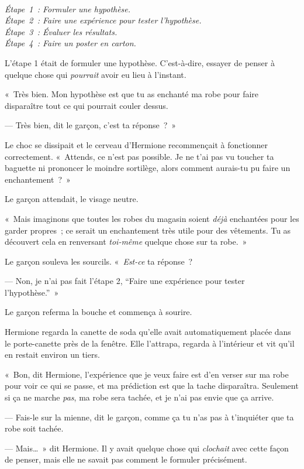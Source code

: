 \emph{\\
Étape~1~: Formuler une hypothèse.\\
Étape~2~: Faire une expérience pour tester l'hypothèse.\\
Étape~3~: Évaluer les résultats.\\
Étape~4~: Faire un poster en carton.\\
}

L'étape 1 était de formuler une hypothèse.
C'est-à-dire, essayer de penser à quelque chose qui \emph{pourrait} avoir eu lieu à l'instant.

«~Très bien. Mon hypothèse est que tu as enchanté ma robe pour faire disparaître tout ce qui pourrait couler dessus.

--- Très bien, dit le garçon, c'est ta réponse~?~»

Le choc se dissipait et le cerveau d'Hermione recommençait à fonctionner correctement.
«~Attends, ce n'est pas possible.
Je ne t'ai pas vu toucher ta baguette ni prononcer le moindre sortilège, alors comment aurais-tu pu faire un enchantement~?~»

Le garçon attendait, le visage neutre.

«~Mais imaginons que toutes les robes du magasin soient \emph{déjà} enchantées pour les garder propres~; ce serait un enchantement très utile pour des vêtements.
Tu as découvert cela en renversant \emph{toi-même} quelque chose sur ta robe.~»

Le garçon souleva les sourcils.
«~\emph{Est-ce} ta réponse~?

--- Non, je n'ai pas fait l'étape 2, “Faire une expérience pour tester l'hypothèse.”~»

Le garçon referma la bouche et commença à sourire.

Hermione regarda la canette de soda qu'elle avait automatiquement placée dans le porte-canette près de la fenêtre.
Elle l'attrapa, regarda à l'intérieur et vit qu'il en restait environ un tiers.

«~Bon, dit Hermione, l'expérience que je veux faire est d'en verser sur ma robe pour voir ce qui se passe, et ma prédiction est que la tache disparaîtra.
Seulement si ça ne marche \emph{pas}, ma robe sera tachée, et je n'ai pas envie que ça arrive.

--- Fais-le sur la mienne, dit le garçon, comme ça tu n'as pas à t'inquiéter que ta robe soit tachée.

--- Mais…~» dit Hermione. Il y avait quelque chose qui \emph{clochait} avec cette façon de penser, mais elle ne savait pas comment le formuler précisément.

